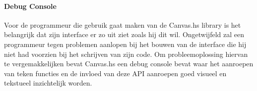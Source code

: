 \paragraph{Debug Console}
Voor de programmeur die gebruik gaat maken van de Canvas.hs library is het belangrijk dat zijn interface er zo uit ziet zoals hij dit wil. Ongetwijfeld zal een programmeur tegen problemen aanlopen bij het bouwen van de interface die hij niet had voorzien bij het schrijven van zijn code. Om probleemoplossing hiervan te vergemakkelijken bevat Canvas.hs een debug console bevat waar het aanroepen van teken functies en de invloed van deze API aanroepen goed visueel en tekstueel inzichtelijk worden.
